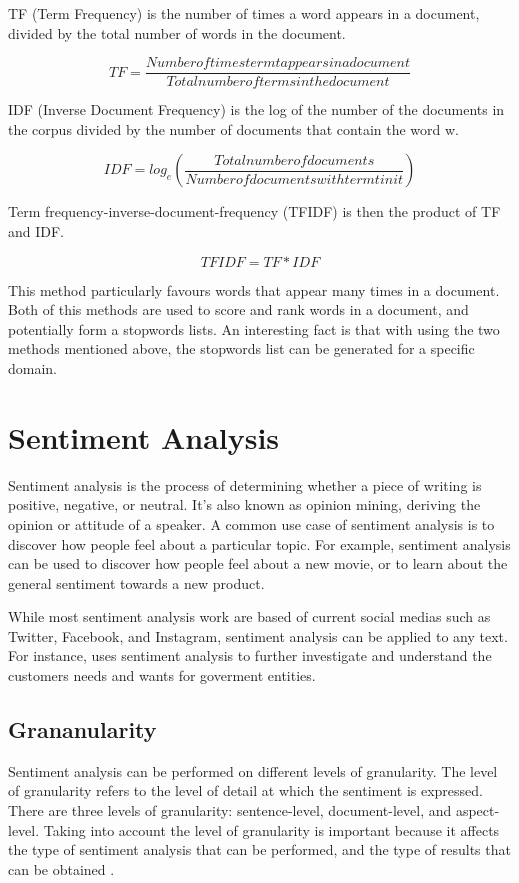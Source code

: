 TF (Term Frequency) is the number of times a word appears in a document, divided by the total number of words in the document. 

\[ TF = \frac{Number of times term t appears in a document}{Total number of terms in the document} \]

IDF (Inverse Document Frequency) is the log of the number of the documents in the corpus divided by the number of documents that contain the word w.

\[ IDF = log_e(\frac{Total number of documents}{Number of documents with term t in it}) \]

Term frequency-inverse-document-frequency (TFIDF) is then the product of TF and IDF.

\[ TFIDF = TF * IDF \]

This method particularly favours words that appear many times in a document. Both of this methods are used to score and rank words in a document, and potentially form a stopwords lists. An interesting fact is that with using the two methods mentioned above, the stopwords list can be generated for a specific domain. 

\pagebreak 

\section{Sentiment Analysis}
Sentiment analysis is the process of determining whether a piece of writing is positive, negative, or neutral. It's also known as opinion mining, deriving the opinion or attitude of a speaker. A common use case of sentiment analysis is to discover how people feel about a particular topic. For example, sentiment analysis can be used to discover how people feel about a new movie, or to learn about the general sentiment towards a new product.

While most sentiment analysis work are based of current social medias such as Twitter, Facebook, and Instagram, sentiment analysis can be applied to any text. For instance, \cite{ABSAUSGRD2019} uses sentiment analysis to further investigate and understand the customers needs and wants for goverment entities.

\subsection{Grananularity}
Sentiment analysis can be performed on different levels of granularity. The level of granularity refers to the level of detail at which the sentiment is expressed. There are three levels of granularity: sentence-level, document-level, and aspect-level. Taking into account the level of granularity is important because it affects the type of sentiment analysis that can be performed, and the type of results that can be obtained \cite{ABSAUSGRD2019}.

